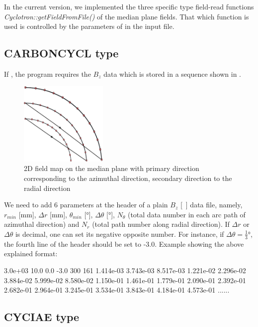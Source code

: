 In the current version, we implemented the three specific type field-read functions \emph{Cyclotron::getFieldFromFile()} of the median plane fields.
That which function is used is controlled by the parameters  of   in the input file.

\subsection{CARBONCYCL type}
If , the program requires the $B_z$ data  which is stored in a sequence shown in .
\begin{figure}[ht]
  \begin{center}
    \includegraphics[origin=bl,height=40mm]{./figures/cyclotron/CarbonFieldFormat.pdf}
    \caption{2D field map on the median plane with primary direction corresponding to the azimuthal direction, secondary direction to the radial direction}
    \label{fig:CYCLField}
  \end{center}
\end{figure}
We need to add 6 parameters at the header of a plain $B_z$ [\si{\kilo\gauss}] data file, namely,
$r_{min}$ [\si{\milli\meter}], $\Delta r$ [\si{\milli\meter}], $\theta_{min}$ [\si{\degree}], $\Delta \theta$ [\si{\degree}],
$N_\theta$ (total data number in each arc path of azimuthal direction) and $N_r$ (total path number along radial direction).
If $\Delta r$ or $\Delta \theta$ is decimal, one can set its negative opposite number. For instance, if $\Delta \theta = \frac{1}{3}\si{\degree}$, the fourth line of the header should be set to -3.0.
Example showing the above explained format:
\begin{example}
3.0e+03
10.0
0.0
-3.0
300
161
1.414e-03  3.743e-03  8.517e-03  1.221e-02  2.296e-02
3.884e-02  5.999e-02  8.580e-02  1.150e-01  1.461e-01
1.779e-01  2.090e-01  2.392e-01  2.682e-01  2.964e-01
3.245e-01  3.534e-01  3.843e-01  4.184e-01  4.573e-01
                        ......
\end{example}

\subsection{CYCIAE type}

